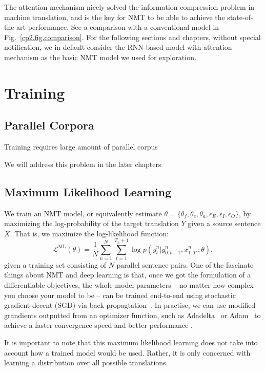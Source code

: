 The attention mechanism nicely solved the information compression problem in machine translation, and is the key for NMT to be able to achieve the state-of-the-art performance. See a comparison with a conventional \sts model in Fig.~\ref{cp2.fig.comparison}. For the following sections and chapters, without special notification, we in default consider the RNN-based \sts model with attention mechanism as the basic NMT model we used for exploration. 


\section{Training}
\subsection{Parallel Corpora}
Training requires large amount of parallel corpus

We will address this problem in the later chapters

\subsection{Maximum Likelihood Learning}
We train an NMT model, or equivalently estimate $\theta =\{\theta_f, \theta_e, \theta_a, \epsilon_E, \epsilon_I, \epsilon_O \}$, by maximizing the log-probability of the target translation $Y$ given a source sentence $X$. That is, we maximize the log-likelihood function:
\begin{equation}
    \mathcal{L}^{\text{ML}}(\theta)  = \frac{1}{N} \sum_{n=1}^N \sum_{t=1}^{T_n+1} \log p(y_t^n| y_{0:t-1}^n, x_{1:T'}^n; \theta),
\end{equation}
given a training set consisting of $N$ parallel sentence pairs. One of the fascinate things about NMT and deep learning is that, once we got the formulation of a differentiable objectives, the whole model parameters -- no matter how complex you choose your model to be -- can be trained end-to-end using stochastic gradient decent (SGD) via back-propagtation~\cite{rumelhart1986learning}. In practise, we can use modified grandients outputted from an optimizer function, such as Adadelta~\cite{zeiler2012adadelta} or Adam~\cite{kingma2014adam} to achieve a faster convergence speed and better performance .

It is important to note that this maximum likelihood learning does not take into account how a trained model would be used. Rather, it is only concerned with learning a distribution over all possible translations. 

